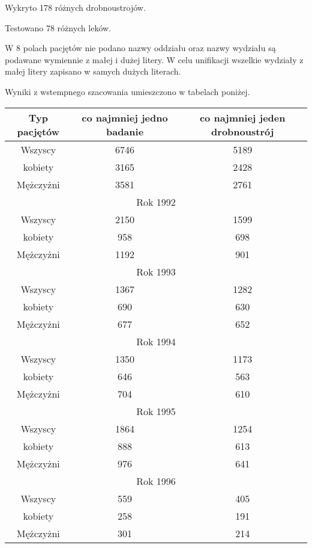 \documentclass[a4paper,12pt]{article}
\begin{document}
Wykryto 178 różnych drobnoustrojów.

Testowano 78 różnych leków.

W 8 polach pacjętów nie podano nazwy oddziału oraz nazwy wydziału są podawane wymiennie z małej i dużej litery.
W celu unifikacji wszelkie wydziały z małej litery zapisano w samych dużych literach.

Wyniki z wstempnego szacowania umieszczono w tabelach poniżej.

\begin{table}[h]
\begin{center}
\begin{tabular}{|c|c|c|}
\hline
Typ pacjętów &  co najmniej jedno badanie  & co najmniej jeden drobnoustrój \\
\hline
Wszyscy & 6746 &5189\\
kobiety  & 3165  & 2428\\
Mężczyżni & 3581 & 2761\\ \hline
\multicolumn{3}{|c|}{Rok 1992} \\ \hline
Wszyscy & 2150 &1599\\
kobiety  & 958  & 698\\
Mężczyżni & 1192 & 901\\ \hline
\multicolumn{3}{|c|}{Rok 1993} \\ \hline
Wszyscy & 1367 &1282\\
kobiety  & 690  & 630\\
Mężczyżni & 677 & 652\\ \hline
\multicolumn{3}{|c|}{Rok 1994} \\ \hline
Wszyscy & 1350 &1173\\
kobiety  & 646  & 563\\
Mężczyżni & 704 & 610\\ \hline
\multicolumn{3}{|c|}{Rok 1995} \\ \hline
Wszyscy & 1864 &1254\\
kobiety  & 888  & 613\\
Mężczyżni & 976 & 641\\ \hline
\multicolumn{3}{|c|}{Rok 1996} \\ \hline
Wszyscy & 559 &405\\
kobiety  & 258  & 191\\
Mężczyżni & 301 & 214\\ \hline
\hline
\end{tabular}
\end{center}
\end{table}
\end{document}
